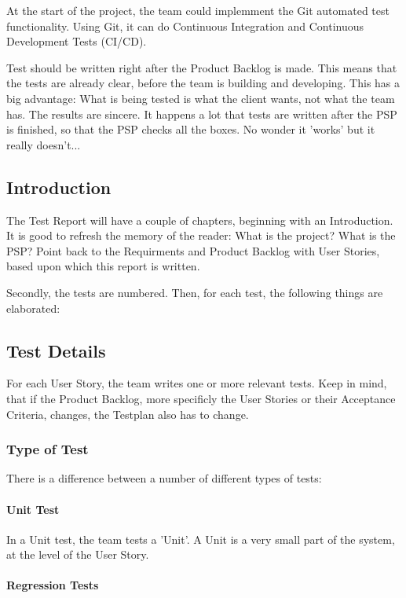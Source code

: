 \documentclass[10pt]{report}
\begin{document}
At the start of the project, the team could implemment the Git automated test functionality. Using Git, it can do Continuous Integration and Continuous Development Tests (CI/CD).

Test should be written right after the Product Backlog is made. This means that the tests are already clear, before the team is building and developing. This has a big advantage: What is being tested is what the client wants, not what the team has. The results are sincere. It happens a lot that tests are written after the PSP is finished, so that the PSP checks all the boxes. No wonder it 'works' but it really doesn't...

\subsection{Introduction}

The Test Report will have a couple of chapters, beginning with an Introduction. It is good to refresh the memory of the reader: What is the project? What is the PSP? Point back to the Requirments and Product Backlog with User Stories, based upon which this report is written.

Secondly, the tests are numbered. Then, for each test, the following things are elaborated:

\subsection{Test Details}

For each User Story, the team writes one or more relevant tests. Keep in mind, that if the Product Backlog, more specificly the User Stories or their Acceptance Criteria, changes, the Testplan also has to change. 

\subsubsection{Type of Test}
There is a difference between a number of different types of tests:

\paragraph{Unit Test}

In a Unit test, the team tests a 'Unit'. A Unit is a very small part of the system, at the level of the User Story.

\paragraph{Regression Tests}
\end{document}
